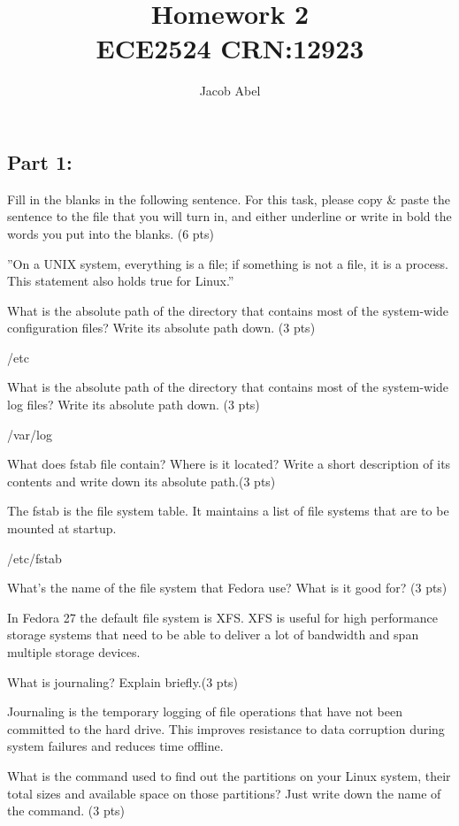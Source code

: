 \documentclass[12pt,letterpaper,titlepage]{article}
\author{Jacob Abel}
\title{	Homework 2
	\\\large ECE2524 CRN:12923
}
\begin{document}
\maketitle

\begin{raggedright}

\section*{Part 1: }

Fill in the blanks in the following sentence. For this task, please copy \& paste the sentence to the file that you will turn in, and either underline or write in bold the words you put into the blanks. (6 pts) 

”On a UNIX system, everything is a file; if something is not a file, it is a process. This statement also holds true for Linux.” 

What is the absolute path of the directory that contains most of the system-wide configuration files? Write its absolute path down. (3 pts) 

/etc

What is the absolute path of the directory that contains most of the system-wide log files? Write its absolute path down. (3 pts)

/var/log

What does fstab file contain? Where is it located? Write a short description of its contents and write down its absolute path.(3 pts)

The fstab is the file system table. It maintains a list of file systems that are to be mounted at startup.

/etc/fstab

What’s the name of the file system that Fedora use? What is it good for? (3 pts)

In Fedora 27 the default file system is XFS. XFS is useful for high performance storage systems that need to be able to deliver a lot of bandwidth and span multiple storage devices. 


What is journaling? Explain briefly.(3 pts)

Journaling is the temporary logging of file operations that have not been committed to the hard drive. This improves resistance to data corruption during system failures and reduces time offline.

What is the command used to find out the partitions on your Linux system, their total sizes and available space on those partitions? Just write down the name of the command. (3 pts)


\end{raggedright}
\end{document}
